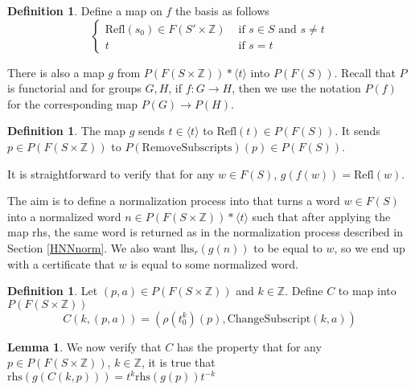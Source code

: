 \documentclass[12pt]{article} %
\theoremstyle{definition}
\theoremstyle{definition}
\theoremstyle{definition}
\newtheorem{lemma}{Lemma}[theorem]
\theoremstyle{definition}
\theoremstyle{definition}
\newtheorem{defn}[theorem]{Definition}
\theoremstyle{definition}
\begin{document}
\begin{defn}\label{tocoprodP}
  Define a map on $f$ the basis as follows
  \begin{equation}
    \begin{cases}
      \text{Refl}(s_0) \in F(S' \times \mathbb{Z}) &
        \text{ if } s \in S \text{ and } s \ne t \\
      t & \text{ if } s = t
    \end{cases}
  \end{equation}
\end{defn}

There is also a map $g$ from $P(F(S \times \mathbb{Z})) \ast \langle t \rangle$ into
$P(F(S))$.
Recall that $P$ is functorial and for groups $G, H$, if $f : G \to H$, then we use the notation
$P(f)$ for the corresponding map $P(G) \to P(H)$.

\begin{defn}
  The map $g$ sends $t \in \langle t \rangle$ to $\text{Refl}(t) \in P(F(S))$.
  It sends $p \in P(F(S \times \mathbb{Z}))$ to $P(\text{RemoveSubscripts})(p) \in P(F(S))$.
\end{defn}

It is straightforward to verify that for any $w \in F(S)$, $g(f(w)) = \text{Refl}(w)$.

The aim is to define a normalization process into that turns a word $w \in F(S)$ into
a normalized word $n \in P(F(S \times \mathbb{Z})) \ast \langle t \rangle$
such that after applying the map rhs, the same word is returned as in the
normalization process described in Section \ref{HNNnorm}. We also want
$\text{lhs}_r(g(n))$ to be equal to $w$, so we end up with a certificate that $w$
is equal to some normalized word.

\begin{defn}\label{conjP}
  Let $(p, a) \in P(F(S \times \mathbb{Z}))$ and $k \in \mathbb{Z}$.
  Define $C$ to map into $P(F(S \times \mathbb{Z}))$
  \begin{equation}
    C(k, (p, a)) = (\rho(t_0^k)(p), \text{ChangeSubscript}(k, a))
  \end{equation}
\end{defn}


\begin{lemma}\label{conjPlemmarhs}
  We now verify that $C$ has the property that for any $p \in P(F(S \times \mathbb{Z}))$,
  $k \in \mathbb{Z}$, it is true that
  $\text{rhs}(g(C(k, p))) = t^k\text{rhs}(g(p))t^{-k}$
\end{lemma}
\end{document}
